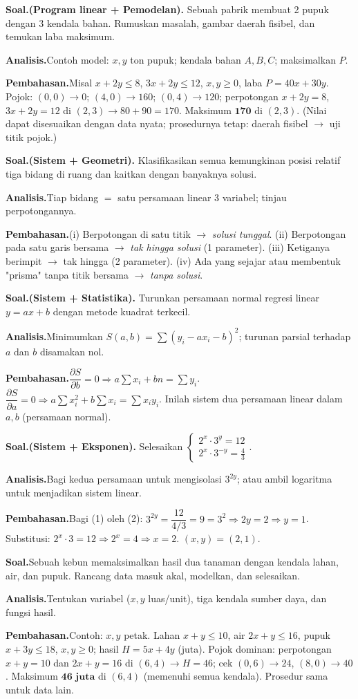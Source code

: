 \documentclass[11pt,a4paper]{report}
\theoremstyle{gaya}
\newcommand{\knomor}[1]{\par\medskip\noindent{\bfseries\color{ungu}#1}\par\nopagebreak}
\newcommand{\ksoal}{\noindent\textbf{\color{biru}Soal.}\space}
\newcommand{\kanalisis}{\par\noindent\textbf{\color{oranye}Analisis.}\space}
\newcommand{\kbahas}{\par\noindent\textbf{\color{hijau}Pembahasan.}\space}
\newcommand{\kbagian}[1]{\par\medskip\noindent{\large\bfseries\color{biru}#1}\par\smallskip}
\begin{document}
\knomor{D.2}
\ksoal \textbf{(Program linear + Pemodelan).} Sebuah pabrik membuat 2 pupuk dengan 3 kendala bahan. Rumuskan masalah, gambar daerah fisibel, dan temukan laba maksimum.
\kanalisis Contoh model: $x,y$ ton pupuk; kendala bahan $A,B,C$; maksimalkan $P$.
\kbahas Misal $x+2y\le8$, $3x+2y\le12$, $x,y\ge0$, laba $P=40x+30y$. Pojok: $(0,0)\to0$; $(4,0)\to160$; $(0,4)\to120$; perpotongan $x+2y=8$, $3x+2y=12$ di $(2,3)\to80+90=170$. Maksimum $\textbf{170}$ di $(2,3)$. (Nilai dapat disesuaikan dengan data nyata; prosedurnya tetap: daerah fisibel $\to$ uji titik pojok.)

\knomor{D.3}
\ksoal \textbf{(Sistem + Geometri).} Klasifikasikan semua kemungkinan posisi relatif tiga bidang di ruang dan kaitkan dengan banyaknya solusi.
\kanalisis Tiap bidang $=$ satu persamaan linear 3 variabel; tinjau perpotongannya.
\kbahas (i) Berpotongan di satu titik $\to$ \emph{solusi tunggal}. (ii) Berpotongan pada satu garis bersama $\to$ \emph{tak hingga solusi} (1 parameter). (iii) Ketiganya berimpit $\to$ tak hingga (2 parameter). (iv) Ada yang sejajar atau membentuk "prisma" tanpa titik bersama $\to$ \emph{tanpa solusi}.

\knomor{D.4}
\ksoal \textbf{(Sistem + Statistika).} Turunkan persamaan normal regresi linear $y=ax+b$ dengan metode kuadrat terkecil.
\kanalisis Minimumkan $S(a,b)=\sum(y_i-ax_i-b)^2$; turunan parsial terhadap $a$ dan $b$ disamakan nol.
\kbahas $\dfrac{\partial S}{\partial b}=0\Rightarrow a\sum x_i+bn=\sum y_i$. $\dfrac{\partial S}{\partial a}=0\Rightarrow a\sum x_i^2+b\sum x_i=\sum x_iy_i$. Inilah sistem dua persamaan linear dalam $a,b$ (persamaan normal).

\knomor{D.5}
\ksoal \textbf{(Sistem + Eksponen).} Selesaikan $\begin{cases} 2^x\cdot 3^y=12\\ 2^x\cdot 3^{-y}=\tfrac43\end{cases}$.
\kanalisis Bagi kedua persamaan untuk mengisolasi $3^{2y}$; atau ambil logaritma untuk menjadikan sistem linear.
\kbahas Bagi (1) oleh (2): $3^{2y}=\dfrac{12}{4/3}=9=3^2\Rightarrow 2y=2\Rightarrow y=1$. Substitusi: $2^x\cdot3=12\Rightarrow2^x=4\Rightarrow x=2$. $(x,y)=(2,1)$.

\kbagian{Challenge Corner}

\knomor{Challenge 1}
\ksoal Sebuah kebun memaksimalkan hasil dua tanaman dengan kendala lahan, air, dan pupuk. Rancang data masuk akal, modelkan, dan selesaikan.
\kanalisis Tentukan variabel ($x,y$ luas/unit), tiga kendala sumber daya, dan fungsi hasil.
\kbahas Contoh: $x,y$ petak. Lahan $x+y\le10$, air $2x+y\le16$, pupuk $x+3y\le18$, $x,y\ge0$; hasil $H=5x+4y$ (juta). Pojok dominan: perpotongan $x+y=10$ dan $2x+y=16$ di $(6,4)\to H=46$; cek $(0,6)\to24$, $(8,0)\to40$. Maksimum $\textbf{46 juta}$ di $(6,4)$ (memenuhi semua kendala). Prosedur sama untuk data lain.
\end{document}

